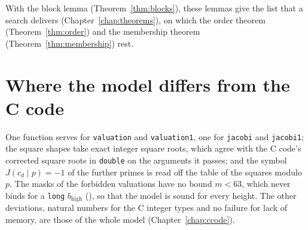 With the block lemma (Theorem~\ref{thm:blocks}), these lemmas give the list that a search delivers
(Chapter~\ref{chap:theorems}), on which the order theorem (Theorem~\ref{thm:order}) and the
membership theorem (Theorem~\ref{thm:membership}) rest.

\section{Where the model differs from the C code}\label{sec:denominatorsDeviations}

One function serves for \verb|valuation| and \verb|valuation1|, one for \verb|jacobi| and
\verb|jacobi1|; the square shapes take exact integer square roots, which agree with the C code's
corrected square roots in \verb|double| on the arguments it passes; and the symbol
$J(c_d \mid p) = -1$ of the further primes is read off the table of the squares modulo~$p$. The
masks of the forbidden valuations have no bound $m < 63$, which never binds for a \verb|long|
$b_{\mathrm{high}}$ (), so that the model is sound for
every height. The other deviations, natural numbers for the C integer types and no failure for
lack of memory, are those of the whole model (Chapter~\ref{chap:ccode}).
